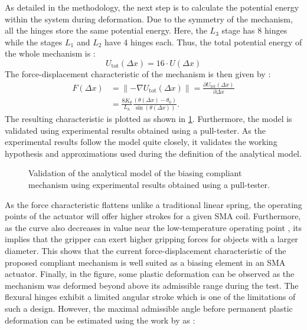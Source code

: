 As detailed in the methodology, the next step is to calculate the potential energy within the system during deformation. Due to the symmetry of the mechanism, all the hinges store the same potential energy. Here, the $L_3$ stage has 8 hinges while the stages $L_1$ and $L_2$ have 4 hinges each. Thus, the total potential energy of the whole mechanism is :
\begin{equation}\label{eq:mandrel-potential-energy-model}
U_\mathrm{tot}(\Delta x) = 16\cdot U(\Delta x)
\end{equation}
The force-displacement characteristic of the mechanism is then given by :
\begin{equation}\label{eq:mandrel-force-model}
\begin{split}
    F(\Delta x) &= \lVert -\nabla{U_\text{tot}(\Delta x)}\rVert = \frac{\partial U_\text{tot}(\Delta x)}{\partial \Delta x}\\
     &= \frac{8K_{\theta}}{L_{h}}  \frac{(\theta(\Delta x)-\theta_{0})}{\sin(\theta(\Delta x))}.
\end{split}
\end{equation}
The resulting characteristic is plotted as shown in \cref{fig:mandrel-am-expt-compare}. Furthermore, the model is validated using experimental results obtained using a pull-tester. As the experimental results follow the model quite closely, it validates the working hypothesis and approximations used during the definition of the analytical model.
\begin{figure}[hbt!] %
  \centering
  \resizebox{0.7\textwidth}{!}{}
  \caption{Validation of the analytical model of the biasing compliant mechanism using experimental results obtained using a pull-tester.}
  \label{fig:mandrel-am-expt-compare}
\end{figure}
As the force characteristic flattens unlike a traditional linear spring, the operating points of the actuator will offer higher strokes for a given SMA coil. Furthermore, as the curve also decreases in value near the low-temperature operating point , its implies that the gripper can exert higher gripping forces for objects with a larger diameter. This shows that the current force-displacement characteristic of the proposed compliant mechanism is well suited as a biasing element in an SMA actuator. Finally, in the figure, some plastic deformation can be observed as the mechanism was deformed beyond above its admissible range during the test. The flexural hinges exhibit a limited angular stroke which is one of the limitations of such a design. However, the maximal admissible angle before permanent plastic deformation can be estimated using the work by \cite{heneinConceptionStructuresArticulees2005} as :
